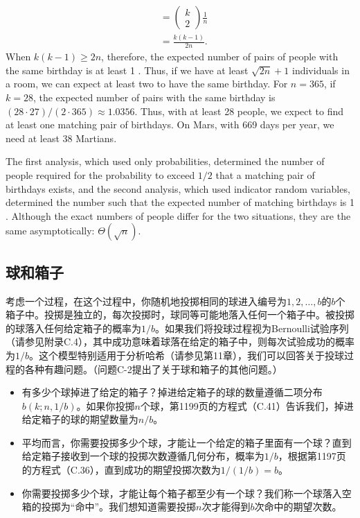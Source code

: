 \documentclass[lang=cn,newtx,10pt,scheme=chinese]{elegantbook}
\begin{document}
$$
\begin{aligned}
& =\left(\begin{array}{l}
k \\
2
\end{array}\right) \frac{1}{n} \\
& =\frac{k(k-1)}{2 n} .
\end{aligned}
$$
When $k(k-1) \geq 2 n$, therefore, the expected number of pairs of people with the same birthday is at least 1 . Thus, if we have at least $\sqrt{2 n}+1$ individuals in a room, we can expect at least two to have the same birthday. For $n=365$, if $k=28$, the expected number of pairs with the same birthday is $(28 \cdot 27) /(2 \cdot 365) \approx 1.0356$. Thus, with at least 28 people, we expect to find at least one matching pair of birthdays. On Mars, with 669 days per year, we need at least 38 Martians.

The first analysis, which used only probabilities, determined the number of people required for the probability to exceed $1 / 2$ that a matching pair of birthdays exists, and the second analysis, which used indicator random variables, determined the number such that the expected number of matching birthdays is 1 . Although the exact numbers of people differ for the two situations, they are the same asymptotically: $\Theta(\sqrt{n})$.

\subsection{球和箱子}

考虑一个过程，在这个过程中，你随机地投掷相同的球进入编号为$1,2,\ldots,b$的$ b $个箱子中。投掷是独立的，每次投掷时，球同等可能地落入任何一个箱子中。被投掷的球落入任何给定箱子的概率为$1/b$。如果我们将投球过程视为Bernoulli试验序列（请参见附录C.4），其中成功意味着球落在给定的箱子中，则每次试验成功的概率为$1/b$。这个模型特别适用于分析哈希（请参见第11章），我们可以回答关于投球过程的各种有趣问题。（问题C-2提出了关于球和箱子的其他问题。）

\begin{itemize}
\item 有多少个球掉进了给定的箱子？掉进给定箱子的球的数量遵循二项分布$b(k;n,1/b)$。如果你投掷$n$个球，第1199页的方程式（C.41）告诉我们，掉进给定箱子的球的期望数量为$n/b$。
\item 平均而言，你需要投掷多少个球，才能让一个给定的箱子里面有一个球？直到给定箱子接收到一个球的投掷次数遵循几何分布，概率为$1/b$，根据第1197页的方程式（C.36），直到成功的期望投掷次数为$1/(1/b)=b$。
\item 你需要投掷多少个球，才能让每个箱子都至少有一个球？我们称一个球落入空箱的投掷为“命中”。我们想知道需要投掷$n$次才能得到$b$次命中的期望次数。
\end{itemize}
\end{document}
